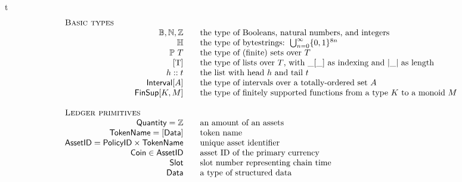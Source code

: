 \begin{ruledfigure}{t}
  \begin{displaymath}
    \begin{array}{rll}
      \multicolumn{3}{l}{\textsc{Basic types}}\\
     \B, \N, \Z && \mbox{the type of Booleans, natural numbers, and integers}\\
      \H{} && \mbox{the type of bytestrings: } \bigcup_{n=0}^{\infty}\{0,1\}^{8n}\\
      \powerset{T} && \mbox{the type of (finite) sets over $T$}\\
      $[T]$ && \mbox{the type of lists over $T$, with $\_[\_]$ as indexing and $|\_|$ as length}\\
      h::t && \mbox{the list with head $h$ and tail $t$}\\
      \Interval{A} && \mbox{the type of intervals over a totally-ordered set $A$}\\
      \FinSup{K}{M} && \mbox{the type of finitely supported functions from a type $K$ to a monoid $M$}\\
      \\
      \multicolumn{3}{l}{\textsc{Ledger primitives}}\\
      \Quantity = \Z && \mbox{an amount of an assets}\\
      \TokenName = [\Data] && \mbox{token name}\\
      \AssetID = \Policy \times \TokenName && \mbox{unique asset identifier}\\
      \Coin \in \AssetID && \mbox{asset ID of the primary currency }\\
      \Tick && \mbox{slot number representing chain time}\\
      \Data && \mbox{a type of structured data}\\

\end{array}
\end{displaymath}
\end{ruledfigure}
